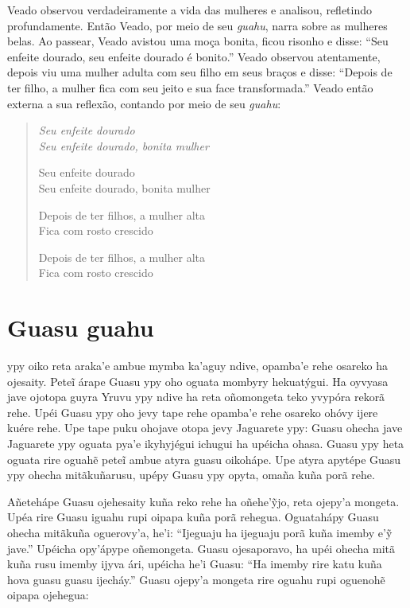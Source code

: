 Veado observou verdadeiramente a vida das mulheres e analisou,
refletindo profundamente. Então Veado, por meio de seu \emph{guahu},
narra sobre as mulheres belas. Ao passear, Veado avistou uma moça
bonita, ficou risonho e disse: ``Seu enfeite dourado, seu enfeite
dourado é bonito.'' Veado observou atentamente, depois viu uma mulher
adulta com seu filho em seus braços e disse: ``Depois de ter filho, a
mulher fica com seu jeito e sua face transformada.'' Veado então externa
a sua reflexão, contando por meio de seu \emph{guahu}:

\begin{verse}
\itshape
Seu enfeite dourado\\
Seu enfeite dourado, bonita mulher

Seu enfeite dourado\\
Seu enfeite dourado, bonita mulher

\pagebreak
Depois de ter filhos, a mulher alta\\
Fica com rosto crescido

Depois de ter filhos, a mulher alta\\
Fica com rosto crescido
\end{verse}

\chapter{Guasu guahu}

\vspace*{-2\baselineskip}

 ypy oiko reta araka'e ambue mymba ka'aguy ndive, opamba'e rehe
osareko ha ojesaity. Peteĩ árape Guasu ypy oho oguata mombyry
hekuatýgui. Ha oyvyasa jave ojotopa guyra Yruvu ypy ndive ha reta
oñomongeta teko yvypóra rekorã rehe. Upéi Guasu ypy oho jevy tape rehe
opamba'e rehe osareko ohóvy ijere kuére rehe. Upe tape puku ohojave
otopa jevy Jaguarete ypy: Guasu ohecha jave Jaguarete ypy oguata pya'e
ikyhyjégui ichugui ha upéicha ohasa. Guasu ypy heta oguata rire oguahẽ
peteĩ ambue atyra guasu oikohápe. Upe atyra apytépe Guasu ypy ohecha
mitãkuñarusu, upépy Guasu ypy opyta, omaña kuña porã rehe.

Añetehápe Guasu ojehesaity kuña reko rehe ha oñehe'ỹjo, reta ojepy'a
mongeta. Upéa rire Guasu iguahu rupi oipapa kuña porã rehegua.
Oguatahápy Guasu ohecha mitãkuña oguerovy'a, he'i: ``Ijeguaju ha
ijeguaju porã kuña imemby e'ỹ jave.'' Upéicha opy'ápype oñemongeta.
Guasu ojesaporavo, ha upéi ohecha mitã kuña rusu imemby ijyva ári,
upéicha he'i Guasu: ``Ha imemby rire katu kuña hova guasu guasu
ijecháy.'' Guasu ojepy'a mongeta rire oguahu rupi oguenohẽ oipapa
ojehegua:

